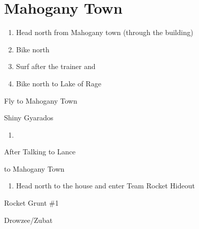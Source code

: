 \newpage
\chapter{Mahogany Town}
\vspace{0.5mm}

\begin{paracol}{2}
\begin{enumerate}
	\item Head north from Mahogany town (through the building)
	\item Bike north 
	\item Surf after the trainer and 
	\item Bike north to Lake of Rage
\end{enumerate}

\switchcolumn*
\begin{story}{Fly to Mahogany Town}
	\varwb
	\varwe
\end{story}

\switchcolumn
\begin{encounter}{Shiny Gyarados}
	\varwb
	\begin{notes}
		\item \masterBall
	\end{notes}
	\varwe
\end{encounter}

\begin{enumerate}[resume]
	\item {}
\end{enumerate}

\begin{menu}{After Talking to Lance}
	\varwb
	\begin{pokeMenu}
		\item {} \fly{} to Mahogany Town \menuHlTwo{(2\pointDown)}
	\end{pokeMenu}
	\varwe
\end{menu}

\begin{enumerate}[resume]
	\item Head north to the house and enter Team Rocket Hideout
\end{enumerate}

\begin{trainer}{Rocket Grunt \#1}
	\varwb
	\begin{fightSection}{Drowzee/Zubat}
		\item {} \strength{} 
	\end{fightSection}
	\varwe
\end{trainer}


\end{paracol}
